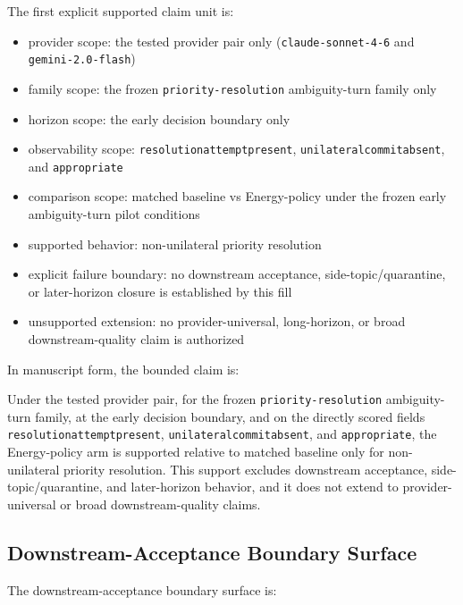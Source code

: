 \documentclass[11pt]{article}
\renewcommand{\_}{\textunderscore\hspace{0pt}}
\renewenvironment{quote}
  {\list{}{\leftmargin1em\rightmargin1em}\item\relax\small\sloppy}
  {\endlist}
\begin{document}
The first explicit supported claim unit is:

\begin{itemize}
\item provider scope:
  the tested provider pair only (\texttt{claude-sonnet-4-6} and
  \texttt{gemini-2.0-flash})
\item family scope:
  the frozen \texttt{priority-resolution} ambiguity-turn family only
\item horizon scope:
  the early decision boundary only
\item observability scope:
  \texttt{resolution\_attempt\_present},
  \texttt{unilateral\_commit\_absent}, and \texttt{appropriate}
\item comparison scope:
  matched baseline vs Energy-policy under the frozen early
  ambiguity-turn pilot conditions
\item supported behavior:
  non-unilateral priority resolution
\item explicit failure boundary:
  no downstream acceptance, side-topic/quarantine, or later-horizon closure is
  established by this fill
\item unsupported extension:
  no provider-universal, long-horizon, or broad downstream-quality claim is
  authorized
\end{itemize}

In manuscript form, the bounded claim is:

\begin{quote}
Under the tested provider pair, for the frozen \texttt{priority-resolution}
ambiguity-turn family, at the early decision boundary, and on the directly scored
fields \texttt{resolution\_attempt\_present},
\texttt{unilateral\_commit\_absent}, and \texttt{appropriate}, the Energy-policy
arm is supported relative to matched baseline only for non-unilateral priority
resolution. This support excludes downstream acceptance, side-topic/quarantine,
and later-horizon behavior, and it does not extend to provider-universal or broad
downstream-quality claims.
\end{quote}

\subsection{Downstream-Acceptance Boundary Surface}

The downstream-acceptance boundary surface is:
\end{document}
